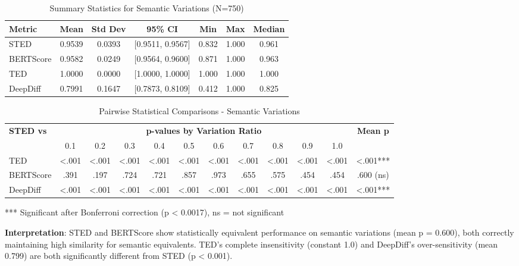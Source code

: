 \documentclass{article}
\begin{document}
\begin{table}[H]
\centering
\caption{Summary Statistics for Semantic Variations (N=750)}
\label{tab:semantic-stats-detailed}
\begin{tabular}{lcccccc}
\toprule
\textbf{Metric} & \textbf{Mean} & \textbf{Std Dev} & \textbf{95\% CI} & \textbf{Min} & \textbf{Max} & \textbf{Median} \\
\midrule
STED & 0.9539 & 0.0393 & [0.9511, 0.9567] & 0.832 & 1.000 & 0.961 \\
BERTScore & 0.9582 & 0.0249 & [0.9564, 0.9600] & 0.871 & 1.000 & 0.963 \\
TED & 1.0000 & 0.0000 & [1.0000, 1.0000] & 1.000 & 1.000 & 1.000 \\
DeepDiff & 0.7991 & 0.1647 & [0.7873, 0.8109] & 0.412 & 1.000 & 0.825 \\
\bottomrule
\end{tabular}
\end{table}

\begin{table}[H]
\centering
\caption{Pairwise Statistical Comparisons - Semantic Variations}
\label{tab:semantic-pairwise}
\small
\begin{tabular}{lccccccccccc}
\toprule
\textbf{STED vs} & \multicolumn{10}{c}{\textbf{p-values by Variation Ratio}} & \textbf{Mean p} \\
\cmidrule{2-11}
& 0.1 & 0.2 & 0.3 & 0.4 & 0.5 & 0.6 & 0.7 & 0.8 & 0.9 & 1.0 & \\
\midrule
TED & <.001 & <.001 & <.001 & <.001 & <.001 & <.001 & <.001 & <.001 & <.001 & <.001 & <.001*** \\
BERTScore & .391 & .197 & .724 & .721 & .857 & .973 & .655 & .575 & .454 & .454 & .600 (ns) \\
DeepDiff & <.001 & <.001 & <.001 & <.001 & <.001 & <.001 & <.001 & <.001 & <.001 & <.001 & <.001*** \\
\bottomrule
\end{tabular}
\vspace{0.3em}
\small{*** Significant after Bonferroni correction (p < 0.0017), ns = not significant}
\end{table}

\textbf{Interpretation}: STED and BERTScore show statistically equivalent performance on semantic variations (mean p = 0.600), both correctly maintaining high similarity for semantic equivalents. TED's complete insensitivity (constant 1.0) and DeepDiff's over-sensitivity (mean 0.799) are both significantly different from STED (p < 0.001).
\end{document}
